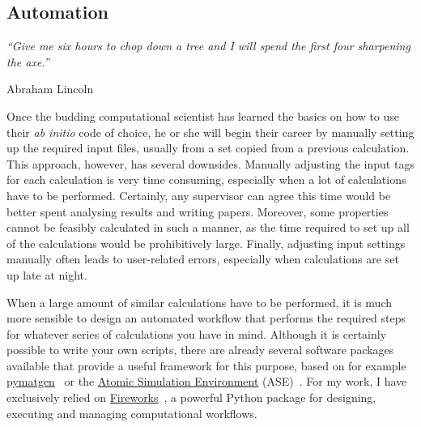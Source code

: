 \begin{refsection} 
 
\chapter{Automation} \label{chapter:automation}
\pagestyle{chapter}

\setlength{\epigraphwidth}{3in} 
\epigraph{\textit{``Give me six hours to chop down a tree and I will spend the 
first four sharpening the axe.''}}{Abraham Lincoln} 
\vspace{3em} 
 
Once the budding computational scientist has learned the basics on how to use 
their \textit{ab initio} code of choice, he or she will begin their career by 
manually setting up the required input files, usually from a set copied from a 
previous calculation. This approach, however, has several downsides. Manually 
adjusting the input tags for each calculation is very time consuming, 
especially when a lot of calculations have to be performed. Certainly, any 
supervisor can agree this time would be better spent analysing results and 
writing papers. Moreover, some properties cannot be feasibly calculated in 
such a manner, as the time required to set up all of the calculations would be 
prohibitively large. Finally, adjusting input settings manually often leads to 
user-related errors, especially when calculations are set up late at night.  

When a large amount of similar calculations have to be performed, it is much 
more sensible to design an automated workflow that performs the required steps 
for whatever series of calculations you have in mind. Although it is certainly 
possible to write your own scripts, there are already several software 
packages available that provide a useful framework for this purpose, based on 
for example \href{http://pymatgen.org/}{pymatgen}~\cite{Ong2013} or the 
\href{https://wiki.fysik.dtu.dk/ase/}{Atomic Simulation Environment} 
(ASE)~\cite{Larsen2017}. For my work, I have exclusively relied on 
\href{https://materialsproject.github.io/fireworks/index.html}{Fireworks}~\cite{Jain2015}, 
a powerful Python package for designing, executing and managing computational 
workflows. 
 

\end{refsection}
